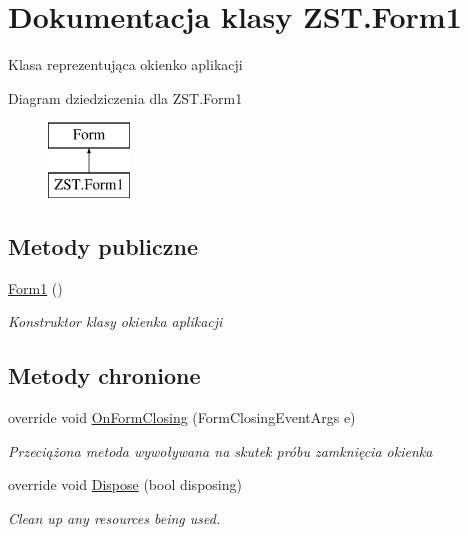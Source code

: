 \hypertarget{class_z_s_t_1_1_form1}{}\section{Dokumentacja klasy Z\+S\+T.\+Form1}
\label{class_z_s_t_1_1_form1}


Klasa reprezentująca okienko aplikacji  


Diagram dziedziczenia dla Z\+S\+T.\+Form1\begin{figure}[H]
\begin{center}
\leavevmode
\includegraphics[height=2.000000cm]{class_z_s_t_1_1_form1}
\end{center}
\end{figure}
\subsection*{Metody publiczne}
\begin{DoxyCompactItemize}
\item 
\hyperlink{class_z_s_t_1_1_form1_adb124d119975d69435c67d0b1c3165d0}{Form1} ()
\begin{DoxyCompactList}\small\item\em Konstruktor klasy okienka aplikacji \end{DoxyCompactList}\end{DoxyCompactItemize}
\subsection*{Metody chronione}
\begin{DoxyCompactItemize}
\item 
override void \hyperlink{class_z_s_t_1_1_form1_ad345d5d88f9d7b9a292987a2576a8fc0}{On\+Form\+Closing} (Form\+Closing\+Event\+Args e)
\begin{DoxyCompactList}\small\item\em Przeciążona metoda wywoływana na skutek próbu zamknięcia okienka \end{DoxyCompactList}\item 
override void \hyperlink{class_z_s_t_1_1_form1_a3c969c64b7dc253cc60cccf9fde8a905}{Dispose} (bool disposing)
\begin{DoxyCompactList}\small\item\em Clean up any resources being used. \end{DoxyCompactList}\end{DoxyCompactItemize}


